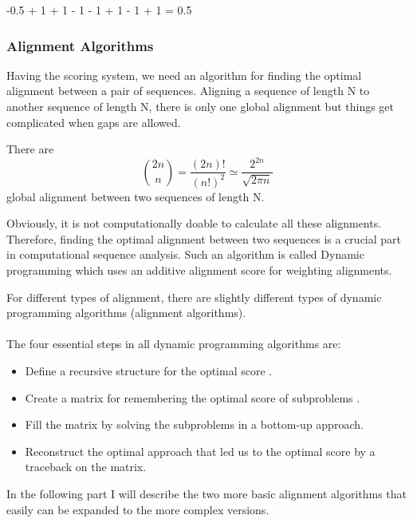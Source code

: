 \documentclass[11pt,a4paper]{report}
\begin{document}
-0.5 + 1 + 1 - 1 - 1 + 1 - 1 + 1 = 0.5




\subsubsection{Alignment Algorithms} \label{Alignment Algorithms}
Having the scoring system, we need an algorithm for finding the 
optimal alignment between a pair of sequences. 
Aligning a sequence of length N to another sequence of length N,
there is only one global alignment but things get complicated when 
gaps are allowed.
 
There are \cite{durbin}
$$ \binom{2n}{n} = \frac{(2n)!}{(n!)^2} \simeq \frac{2^{2n}}
{\sqrt{2\pi n}} $$
global alignment between two sequences of length N.

Obviously, it is not computationally doable to calculate all these
alignments. Therefore, finding the optimal alignment between two 
sequences is a crucial part in computational sequence analysis.
Such an algorithm is called Dynamic programming which uses an 
additive alignment score for  weighting alignments. 

For different types of alignment, there are slightly different 
types of dynamic programming algorithms (alignment algorithms).\\\\


The four essential steps in all dynamic programming algorithms are:

\begin{itemize} 
	\item Define a recursive structure for the optimal score
	\cite{eddydynamic}.
	\item  Create a  matrix for remembering the optimal score 
	of subproblems \cite{eddydynamic}.	
	\item Fill the matrix by solving the  subproblems in a 
	bottom-up approach\cite{eddydynamic}.
	\item Reconstruct the optimal approach that led us to the 
	optimal score by a traceback on the matrix\cite{eddydynamic}.
\end{itemize}

In the following part I will describe the two more basic alignment 
algorithms that easily can be expanded to the more complex versions.
\end{document}
